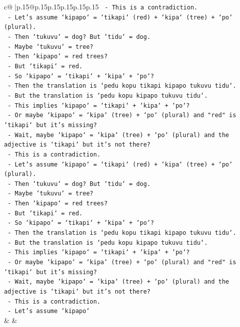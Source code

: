 \documentclass{article}
\begin{document}
{\begin{supertabular}{c@{$\;$}|p{.15\linewidth}@{}p{.15\linewidth}p{.15\linewidth}p{.15\linewidth}p{.15\linewidth}p{.15\linewidth}}
{{{\texttt{          {-} This is a contradiction.} \\
\texttt{          {-} Let's assume `kipapo` = `tikapi` (red) + `kipa` (tree) + `po` (plural).} \\
\texttt{          {-} Then `tukuvu` = dog? But `tidu` = dog.} \\
\texttt{          {-} Maybe `tukuvu` = tree?} \\
\texttt{          {-} Then `kipapo` = red trees?} \\
\texttt{          {-} But `tikapi` = red.} \\
\texttt{          {-} So `kipapo` = `tikapi` + `kipa` + `po`?} \\
\texttt{          {-} Then the translation is `pedu kopu tikapi kipapo tukuvu tidu`.} \\
\texttt{          {-} But the translation is `pedu kopu kipapo tukuvu tidu`.} \\
\texttt{          {-} This implies `kipapo` = `tikapi` + `kipa` + `po`?} \\
\texttt{          {-} Or maybe `kipapo` = `kipa` (tree) + `po` (plural) and "red" is `tikapi` but it's missing?} \\
\texttt{          {-} Wait, maybe `kipapo` = `kipa` (tree) + `po` (plural) and the adjective is `tikapi` but it's not there?} \\
\texttt{          {-} This is a contradiction.} \\
\texttt{          {-} Let's assume `kipapo` = `tikapi` (red) + `kipa` (tree) + `po` (plural).} \\
\texttt{          {-} Then `tukuvu` = dog? But `tidu` = dog.} \\
\texttt{          {-} Maybe `tukuvu` = tree?} \\
\texttt{          {-} Then `kipapo` = red trees?} \\
\texttt{          {-} But `tikapi` = red.} \\
\texttt{          {-} So `kipapo` = `tikapi` + `kipa` + `po`?} \\
\texttt{          {-} Then the translation is `pedu kopu tikapi kipapo tukuvu tidu`.} \\
\texttt{          {-} But the translation is `pedu kopu kipapo tukuvu tidu`.} \\
\texttt{          {-} This implies `kipapo` = `tikapi` + `kipa` + `po`?} \\
\texttt{          {-} Or maybe `kipapo` = `kipa` (tree) + `po` (plural) and "red" is `tikapi` but it's missing?} \\
\texttt{          {-} Wait, maybe `kipapo` = `kipa` (tree) + `po` (plural) and the adjective is `tikapi` but it's not there?} \\
\texttt{          {-} This is a contradiction.} \\
\texttt{          {-} Let's assume `kipapo`} \\
            }
        }
    }
    & & \\ \\


\end{supertabular}}
\end{document}
